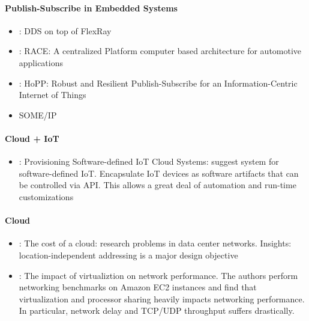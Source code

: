 \paragraph{Publish-Subscribe in Embedded Systems}
\begin{itemize}
	\item \cite{bouhouch2013dds}: DDS on top of FlexRay
	\item \cite{sommer2013race}: RACE: A centralized Platform computer based architecture for automotive applications
	\item \cite{gundougan2018hopp}: HoPP: Robust and Resilient Publish-Subscribe for an Information-Centric Internet of Things
	\item SOME/IP
\end{itemize}


\paragraph{Cloud + IoT}

\begin{itemize}
	\item \cite{nastic2014provisioning}: Provisioning Software-defined IoT Cloud Systems: suggest system for software-defined IoT. Encapsulate IoT devices as software artifacts that can be controlled via API. This allows a great deal of automation and run-time customizations
\end{itemize}


\paragraph{Cloud}

\begin{itemize}
	\item \cite{greenberg2008cost}: The cost of a cloud: research problems in data center networks. Insights: location-independent addressing is a major design objective
	\item \cite{wang2010impact}: The impact of virtualiztion on network performance. The authors perform networking benchmarks on Amazon EC2 instances and find that virtualization and processor sharing heavily impacts networking performance. In particular, network delay and TCP/UDP throughput suffers drastically.
\end{itemize}


